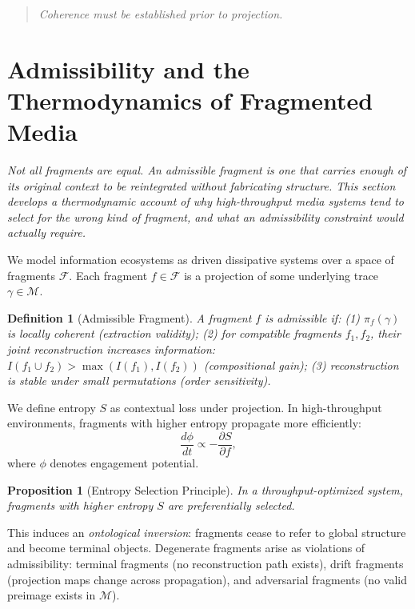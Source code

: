 \documentclass[12pt,a4paper]{article}
\newtheorem{proposition}[theorem]{Proposition}
\newtheorem{definition}[theorem]{Definition}
\begin{document}
\begin{quote}
\emph{Coherence must be established prior to projection.}
\end{quote}

\section{Admissibility and the Thermodynamics of Fragmented Media}
\label{sec:admissibility}

\textit{Not all fragments are equal. An admissible fragment is one that carries enough of its original context to be reintegrated without fabricating structure. This section develops a thermodynamic account of why high-throughput media systems tend to select for the wrong kind of fragment, and what an admissibility constraint would actually require.}

We model information ecosystems as driven dissipative systems over a space of fragments $\mathcal{F}$. Each fragment $f \in \mathcal{F}$ is a projection of some underlying trace $\gamma \in \mathcal{M}$.

\begin{definition}[Admissible Fragment]
A fragment $f$ is admissible if: (1) $\pi_f(\gamma)$ is locally coherent (extraction validity); (2) for compatible fragments $f_1, f_2$, their joint reconstruction increases information: $I(f_1 \cup f_2) > \max(I(f_1), I(f_2))$ (compositional gain); (3) reconstruction is stable under small permutations (order sensitivity).
\end{definition}

We define entropy $S$ as contextual loss under projection. In high-throughput environments, fragments with higher entropy propagate more efficiently:
\[
\frac{d\phi}{dt} \propto -\frac{\partial S}{\partial f},
\]
where $\phi$ denotes engagement potential.

\begin{proposition}[Entropy Selection Principle]
In a throughput-optimized system, fragments with higher entropy $S$ are preferentially selected.
\end{proposition}

This induces an \emph{ontological inversion}: fragments cease to refer to global structure and become terminal objects. Degenerate fragments arise as violations of admissibility: terminal fragments (no reconstruction path exists), drift fragments (projection maps change across propagation), and adversarial fragments (no valid preimage exists in $\mathcal{M}$).
\end{document}
